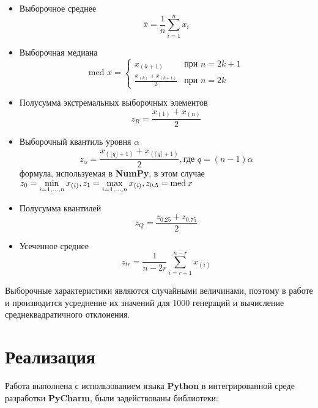 \documentclass[12pt,a4paper]{article}
\begin{document}
\begin{itemize}
	\item Выборочное среднее
	\begin{equation}
		\bar x = \frac{1}{n}\sum_{i=1}^{n}{x_i}
	\end{equation}
	
	\item Выборочная медиана
	\begin{equation}
		\text{med }x = 
		\begin{cases}
			x_{(k+1)} &\text{при $n=2k+1$}\\
			\frac{x_{(k)} + x_{(k+1)}}{2} &\text{при $n=2k$}
		\end{cases}
	\end{equation}
	
	\item Полусумма экстремальных выборочных элементов
	\begin{equation}
		z_R = \frac{x_{(1)} + x_{(n)}}{2}
	\end{equation}
	
	\item Выборочный квантиль уровня $\alpha$
	\begin{equation}
		z_{\alpha} = \frac{x_{(\lfloor q \rfloor+1)} +
							x_{(\lceil q \rceil+1)}}{2}, \text{где } q=(n-1)\alpha
	\end{equation}
	формула, используемая в \textbf{NumPy}, в этом случае $z_0 = \min\limits_{i=1,...,n}x_{(i)}, z_1 = \max\limits_{i=1,...,n}x_{(i)},
	\newline z_{0.5} = \text{med} \hspace{2pt} x$
	
	\item Полусумма квантилей
	\begin{equation}
		z_Q = \frac{z_{0.25} + z_{0.75}}{2}
	\end{equation}
	
	\item Усеченное среднее
	\begin{equation}
		z_{tr} = \frac{1}{n-2r}\sum_{i=r+1}^{n-r}x_{(i)}
	\end{equation}
\end{itemize}
	
	Выборочные характеристики являются случайными величинами, поэтому в работе и производится усреднение их значений для 1000 генераций и вычисление среднеквадратичного отклонения.

\pagebreak

\section{Реализация}
Работа выполнена с использованием языка \textbf{Python} в интегрированной среде разработки \textbf{PyCharm}, были задействованы библиотеки:
\end{document}
